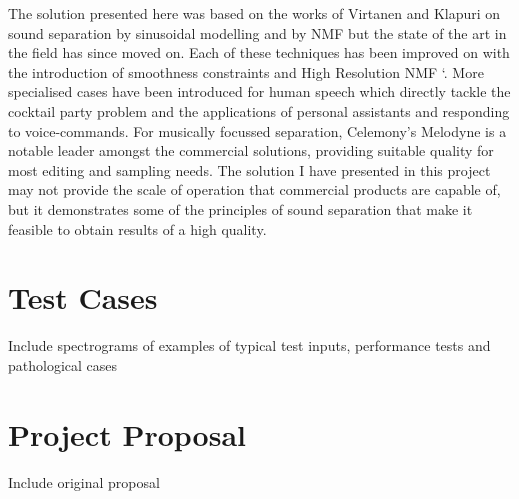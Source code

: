 \documentclass[10pt,twoside,a4paper]{report}
\begin{document}

The solution presented here was based on the works of Virtanen and Klapuri \cite{virtanen2000separation} on sound separation by sinusoidal modelling and by NMF \cite{virtanen2003sound} but the state of the art in the field has since moved on. Each of these techniques has been improved on with the introduction of smoothness constraints \cite{virtanen2003algorithm} and High Resolution NMF \cite{badeau2011gaussian}`. More specialised cases have been introduced for human speech which directly tackle the cocktail party problem and the applications of personal assistants and responding to voice-commands. For musically focussed separation, Celemony's Melodyne \cite{melodyne} is a notable leader amongst the commercial solutions, providing suitable quality for most editing and sampling needs. The solution I have presented in this project may not provide the scale of operation that commercial products are capable of, but it demonstrates some of the principles of sound separation that make it feasible to obtain results of a high quality.

\appendix

\chapter{Test Cases}

Include spectrograms of examples of typical test inputs, performance tests and pathological cases






\chapter{Project Proposal}

Include original proposal
\end{document}
